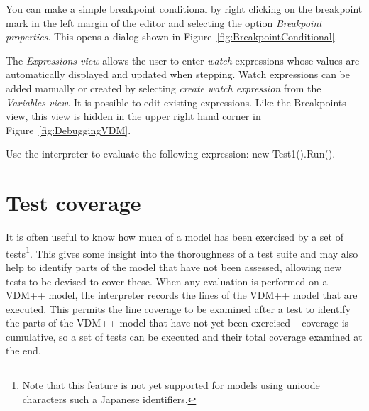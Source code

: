 You can make a simple breakpoint conditional by right clicking on the
breakpoint mark in the left margin of the editor and selecting the
option \emph{Breakpoint properties}. This opens a dialog shown in
Figure~\ref{fig:BreakpointConditional}.

The \emph{Expressions view} allows the user to enter \emph{watch}
expressions whose values are automatically displayed and updated when
stepping. Watch expressions can be added manually or created by
selecting \emph{create watch expression} from the \emph{Variables view}. It
is possible to edit existing expressions.  Like the Breakpoints view,
this view is hidden in the upper right hand corner in
Figure~\ref{fig:DebuggingVDM}.



\begin{myexercise}
\label{ex:tool-monitor}Use the interpreter to evaluate the
  following expression: {\ttfamily new Test1().Run()}.
\end{myexercise}



\section{Test coverage}\label{sec:testcov}

It is often useful to know how much of a model has been exercised by a
set of tests\footnote{Note that this feature is not yet supported for
  models using unicode characters such a Japanese identifiers.}. 
This gives some insight into the thoroughness of a test
suite and may also help to identify parts of the model that have not
been assessed, allowing new tests to be devised to cover these. When
any evaluation is performed on a VDM++ model, the interpreter records
the lines of the VDM++ model that are executed. This permits the line
coverage to be examined after a test to identify the parts of the
VDM++ model that have not yet been exercised -- coverage is
cumulative, so a set of tests can be executed and their total coverage
examined at the end.

